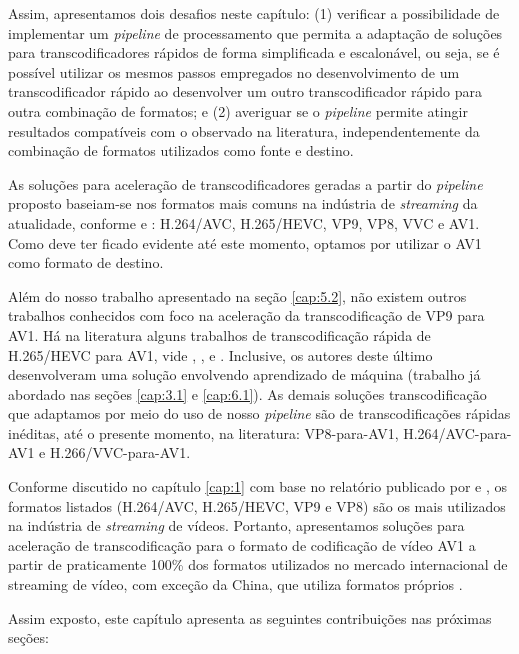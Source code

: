 Assim, apresentamos dois desafios neste capítulo: (1) verificar a possibilidade de implementar um \textit{pipeline} de processamento que permita a adaptação de soluções para transcodificadores rápidos de forma simplificada e escalonável, ou seja, se é possível utilizar os mesmos passos empregados no desenvolvimento de um transcodificador rápido ao desenvolver um outro transcodificador rápido para outra combinação de formatos; e (2) averiguar se o \textit{pipeline} permite atingir resultados compatíveis com o observado na literatura, independentemente da combinação de formatos utilizados como fonte e destino. 

As soluções para aceleração de transcodificadores geradas a partir do \textit{pipeline} proposto baseiam-se nos formatos mais comuns na indústria de \textit{streaming} da atualidade, conforme \citet{bib:bitmovin_report_2021} e \citet{bib:bitmovin_report_2022}: H.264/AVC, H.265/HEVC, VP9, VP8, VVC e AV1. Como deve ter ficado evidente até este momento, optamos por utilizar  o AV1 como formato de destino.

Além do nosso trabalho apresentado na seção \ref{cap:5.2}, não existem outros trabalhos conhecidos com foco na aceleração da transcodificação de VP9 para AV1. Há na literatura alguns trabalhos de transcodificação rápida de H.265/HEVC para AV1, vide \citet{bib:borges_2019}, \citet{bib:borges2_2019}, \citet{bib:borges2_2021} e \citet{bib:chen_2019}. Inclusive, os autores deste último desenvolveram uma solução envolvendo aprendizado de máquina (trabalho já abordado nas seções \ref{cap:3.1} e \ref{cap:6.1}). As demais soluções transcodificação que adaptamos por meio do uso de nosso \textit{pipeline} são de transcodificações rápidas inéditas, até o presente momento, na literatura: VP8-para-AV1, H.264/AVC-para-AV1 e H.266/VVC-para-AV1.

Conforme discutido no capítulo \ref{cap:1} com base no relatório publicado por \citet{bib:bitmovin_report_2021} e \citet{bib:bitmovin_report_2022}, os formatos listados (H.264/AVC, H.265/HEVC, VP9 e VP8) são os mais utilizados na indústria de \textit{streaming} de vídeos. Portanto, apresentamos soluções para aceleração de transcodificação para o formato de codificação de vídeo AV1 a partir de praticamente 100\% dos formatos utilizados no mercado internacional de streaming de vídeo, com exceção da China, que utiliza formatos próprios \cite{bib:china_codecs}.

Assim exposto, este capítulo apresenta as seguintes contribuições nas próximas seções:

